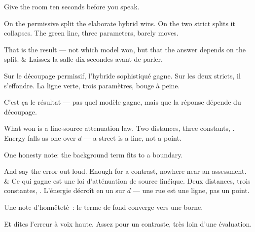 \documentclass[10pt,a4paper]{article}
\begin{document}
\begin{say}
Give the room ten seconds before you speak.

 On the permissive split the elaborate hybrid wins.
On the two strict splits it collapses. The green line, three parameters, barely
moves.

 That is the result --- not which model won, but that the answer
depends on the split.
&
Laissez la salle dix secondes avant de parler.

 Sur le découpage permissif, l'hybride
sophistiqué gagne. Sur les deux stricts, il s'effondre. La ligne verte, trois
paramètres, bouge à peine.

 C'est ça le résultat --- pas quel modèle gagne, mais que
la réponse dépende du découpage.
\end{say}

\begin{say}
What won is a line-source attenuation law. Two distances, three constants,
. Energy falls as one over $d$ --- a street is a line,
not a point.

One honesty note: the background term fits to a boundary. 

And say the error out loud.  Enough for a contrast, nowhere near an assessment.
&
Ce qui gagne est une loi d'atténuation de source linéique. Deux distances, trois
constantes, . L'énergie décroît en un sur $d$ --- une rue
est une ligne, pas un point.

Une note d'honnêteté~: le terme de fond converge vers une borne. 

Et dites l'erreur à voix haute.  Assez pour un contraste, très loin d'une évaluation.
\end{say}
\end{document}
